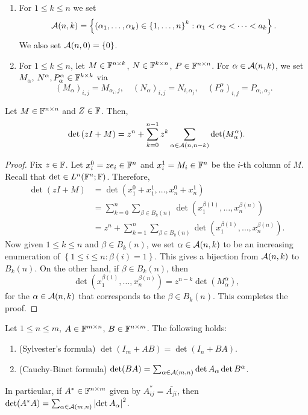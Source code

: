 \documentclass[a4paper]{article}
\begin{document}
\begin{defi}
\begin{enumerate}
\item For $1 \leq k \leq n$ we set 
\[
\mathcal{A}(n, k) = \left\{ (\alpha_1, \dots, \alpha_k)  
\in \left\{ 1, \dots, n \right\}^k : 
\alpha_1 < \alpha_2 < \dots < a_k \right\}.
\]
We also set $\mathcal{A}(n, 0) = \left\{ 0 \right\}$. 

\item For $1 \leq k \leq n$, let $M \in \mathbb{F}^{n \times k}$, 
$N \in \mathbb{F}^{k \times n}$, $P \in \mathbb{F}^{n \times n}$. For 
$\alpha \in \mathcal{A}(n, k)$, we set 
$M_\alpha$, $N^\alpha, P_\alpha^\alpha \in \mathbb{F}^{k \times k}$
via 
\[
(M_\alpha)_{i, j} = M_{\alpha_i, j}, \quad 
(N_\alpha)_{i, j} = N_{i, \alpha_j}, \quad 
(P_\alpha^\alpha)_{i, j} = P_{\alpha_i, \alpha_j}.
\]
\end{enumerate}
\end{defi}

\begin{thm}
Let $M \in \mathbb{F}^{n \times n}$ and $Z \in \mathbb{F}$. Then, 
\[
\det \left( zI + M \right) = z^n + \sum_{k=0}^{n-1}
z^k \sum_{\alpha \in \mathcal{A}(n, n - k)} \det(M_\alpha^\alpha).
\]
\end{thm}

\begin{proof}
Fix $z \in \mathbb{F}$. Let $x_i^0 = z e_i \in \mathbb{F}^n$ and 
$x_i^1 = M_i \in \mathbb{F}^n$ be the $i$-th column of $M$. 
Recall that $\det \in L^n (\mathbb{F}^n ; \mathbb{F})$. Therefore, 
\[
\begin{aligned}
\det (z I + M) 
&= \det (x_1^0 + x_1^1, \dots, x_n^0 + x_n^1) \\ 
&= \sum_{k=0}^n \sum_{\beta \in B_k(n)} 
\det (x_1^{\beta(1)}, \dots, x_n^{\beta(n)}) \\ 
&= z^n + \sum_{k=1}^n \sum_{\beta \in B_k(n)} 
\det (x_1^{\beta(1)}, \dots, x_n^{\beta(n)}).
\end{aligned}
\]
Now given $1 \leq k \leq n$ and $\beta \in B_k(n)$, 
we set $\alpha \in \mathcal{A}(n, k)$ to be an increasing 
enumeration of $\left\{ 1 \leq i \leq n : \beta(i) = 1 
\right\}$. This gives a bijection from $\mathcal{A}(n, k)$
to $B_k(n)$. On the other hand, if $\beta \in B_k(n)$, 
then 
\[
\det (x_1^{\beta(1)}, \dots, x_n^{\beta(n)}) 
= z^{n - k} \det(M_\alpha^\alpha),
\]
for the $\alpha \in \mathcal{A}(n, k)$ that corresponds to 
the $\beta \in B_k(n)$. This completes the proof.
\end{proof}

\begin{thm}
Let $1 \leq n \leq m$, $A \in \mathbb{F}^{m \times n}$, 
$B \in \mathbb{F}^{n \times m}$. The following holds: 
\begin{enumerate}
\item (Sylvester's formula) $\det(I_m + A B)
= \det(I_n + BA)$.

\item (Cauchy-Binet formula) $\det(BA) = \sum_{\alpha 
\in \mathcal{A}(m, n)} \det A_\alpha \det B^\alpha$.
\end{enumerate}
In particular, if $A^* \in \mathbb{F}^{n \times m}$ given 
by $A^*_{ij} = \bar{A_{ji}}$, then 
$\det(A^* A) = \sum_{\alpha \in \mathcal{A}(m, n)} 
\left\lvert \det A_\alpha\right\rvert^2$.
\end{thm}
\end{document}
